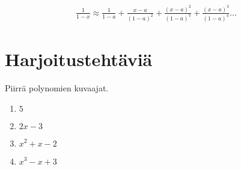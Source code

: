\begin{align*}
	\frac{1}{1-x} \approx \frac{1}{1-a} + \frac{x-a}{(1-a)^2} + \frac{(x-a)^2}{(1-a)^3} + \frac{(x-a)^3}{(1-a)^4} ...
\end{align*}


\section{Harjoitustehtäviä}
\begin{tehtava}
	Piirrä polynomien kuvaajat.
	\begin{enumerate}
		\item $5$
		\item $2x-3$
		\item $x^2+x-2$
		\item $x^3-x+3$
	\end{enumerate}

	\begin{vastaus}
	\end{vastaus}
\end{tehtava}